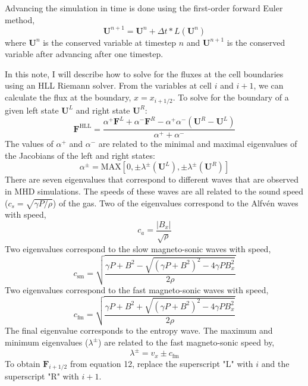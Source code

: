 \documentclass{article}
\begin{document}
Advancing the simulation in time is done using the first-order forward Euler method,
\begin{equation}
    \boldsymbol{U}^{n+1} = \boldsymbol{U}^n + \Delta t *L(\boldsymbol{U}^n)
\end{equation}
where $\boldsymbol{U}^n$ is the conserved variable at timestep $n$ and $\boldsymbol{U}^{n+1}$ is the conserved variable after advancing after one timestep.

In this note, I will describe how to solve for the fluxes at the cell boundaries using an HLL Riemann solver. From the variables at cell $i$ and $i+1$, we can calculate the flux at the boundary, $x=x_{i+1/2}$. To solve for the boundary of a given left state $\boldsymbol{U}^L$ and right state $\boldsymbol{U}^R$:
\begin{equation}
    \boldsymbol{F}^{\text{HLL}}=\frac{\alpha^+ \boldsymbol{F}^L + \alpha^- \boldsymbol{F}^R -\alpha^+ \alpha^- (\boldsymbol{U}^R - \boldsymbol{U}^L)}{\alpha^+ + \alpha^-}
\end{equation}
The values of $\alpha^+$ and $\alpha^-$ are related to the minimal and maximal eigenvalues of the Jacobians of the left and right states:
\begin{equation}
    \alpha^{\pm}=\text{MAX}[0, \pm \lambda^{\pm}(\boldsymbol{U}^L), \pm \lambda^{\pm}(\boldsymbol{U}^R)]
\end{equation}
There are seven eigenvalues that correspond to different waves that are observed in MHD simulations. The speeds of these waves are all related to the sound speed ($c_s = \sqrt{\gamma P/\rho}$) of the gas. Two of the eigenvalues correspond to the Alfv\'en waves with speed, 
\begin{equation}
    c_a = \frac{|B_x|}{\sqrt{\rho}}
\end{equation} 
Two eigenvalues correspond to the slow magneto-sonic waves with speed,
\begin{equation}
    c_{\text{sm}} = \sqrt{\frac{\gamma P + B^2 - \sqrt{(\gamma P + B^2)^2 -4\gamma P B^2_x}}{2 \rho}}
\end{equation}
Two eigenvalues correspond to the fast magneto-sonic waves with speed,
\begin{equation}
    c_{\text{fm}} = \sqrt{\frac{\gamma P + B^2 + \sqrt{(\gamma P + B^2)^2 -4\gamma P B^2_x}}{2 \rho}}
\end{equation}
The final eigenvalue corresponds to the entropy wave. The maximum and minimum eigenvalues ($\lambda^{\pm}$) are related to the fast magneto-sonic speed by,
\begin{equation}
    \lambda^{\pm} = v_x \pm c_{\text{fm}}
\end{equation}
To obtain $\boldsymbol{F}_{i+1/2}$ from equation 12, replace the superscript "L" with $i$ and the superscript "R" with $i+1$.
\end{document}
